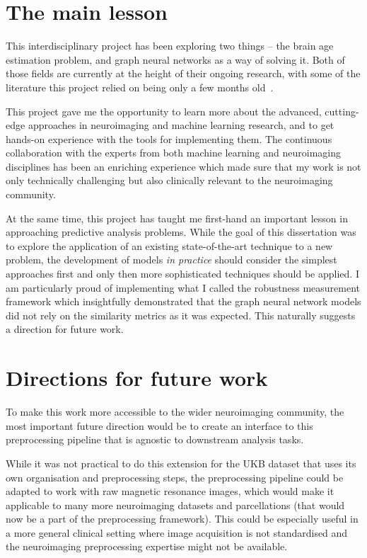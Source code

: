 \section{The main lesson}
This interdisciplinary project has been exploring two things – the brain age estimation problem, and graph neural networks as a way of solving it. Both of those fields are currently at the height of their ongoing research, with some of the literature this project relied on being only a few months old~\cite{kaufmann2019, niu2019improved, pervaiz2020optimising}.

This project gave me the opportunity to learn more about the advanced, cutting-edge approaches in neuroimaging and machine learning research, and to get hands-on experience with the tools for implementing them. The continuous collaboration with the experts from both machine learning and neuroimaging disciplines has been an enriching experience which made sure that my work is not only technically challenging but also clinically relevant to the neuroimaging community. 

At the same time, this project has taught me first-hand an important lesson in approaching predictive analysis problems. While the goal of this dissertation was to explore the application of an existing state-of-the-art technique to a new problem, the development of models \textit{in practice} should consider the simplest approaches first and only then more sophisticated techniques should be applied. I am particularly proud of implementing what I called the robustness measurement framework which insightfully demonstrated that the graph neural network models did not rely on the similarity metrics as it was expected. This naturally suggests a direction for future work.

\section{Directions for future work}
To make this work more accessible to the wider neuroimaging community, the most important future direction would be to create an interface to this preprocessing pipeline that is agnostic to downstream analysis tasks.

While it was not practical to do this extension for the UKB dataset that uses its own organisation and preprocessing steps, the preprocessing pipeline could be adapted to work with raw magnetic resonance images, which would make it applicable to many more neuroimaging datasets and parcellations (that would now be a part of the preprocessing framework). This could be especially useful in a more general clinical setting where image acquisition is not standardised and the neuroimaging preprocessing expertise might not be available. 

